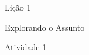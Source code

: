 \documentclass{article}
\begin{document}
       


\begin{dynamiccontents}{1}
Lição 1

Explorando o Assunto

Atividade 1

\lipsum[1-10] 
\end{dynamiccontents}

       
\lipsum[1-10]

% 
% 
% 




\end{document}
